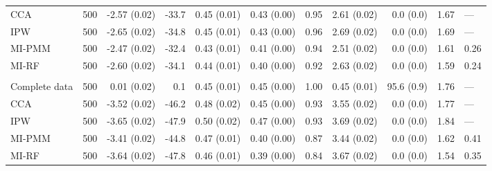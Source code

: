 \documentclass[11pt,a4paper]{article}
\begin{document}
\begin{landscape}
\begin{longtable}{l|rrrrrrrrrl}
CCA & 500 & -2.57 (0.02) & -33.7 & 0.45 (0.01) & 0.43 (0.00) & 0.95 & 2.61 (0.02) & 0.0 (0.0) & 1.67 & — \\ 
IPW & 500 & -2.65 (0.02) & -34.8 & 0.45 (0.01) & 0.43 (0.00) & 0.96 & 2.69 (0.02) & 0.0 (0.0) & 1.69 & — \\ 
MI-PMM & 500 & -2.47 (0.02) & -32.4 & 0.43 (0.01) & 0.41 (0.00) & 0.94 & 2.51 (0.02) & 0.0 (0.0) & 1.61 & 0.26 \\ 
MI-RF & 500 & -2.60 (0.02) & -34.1 & 0.44 (0.01) & 0.40 (0.00) & 0.92 & 2.63 (0.02) & 0.0 (0.0) & 1.59 & 0.24 \\ 
\midrule\addlinespace[2.5pt]
\multicolumn{11}{l}{Wasting — MNAR 50\%} \\[2.5pt] 
\midrule\addlinespace[2.5pt]
Complete data & 500 & 0.01 (0.02) & 0.1 & 0.45 (0.01) & 0.45 (0.00) & 1.00 & 0.45 (0.01) & 95.6 (0.9) & 1.76 & — \\ 
CCA & 500 & -3.52 (0.02) & -46.2 & 0.48 (0.02) & 0.45 (0.00) & 0.93 & 3.55 (0.02) & 0.0 (0.0) & 1.77 & — \\ 
IPW & 500 & -3.65 (0.02) & -47.9 & 0.50 (0.02) & 0.47 (0.00) & 0.93 & 3.69 (0.02) & 0.0 (0.0) & 1.84 & — \\ 
MI-PMM & 500 & -3.41 (0.02) & -44.8 & 0.47 (0.01) & 0.40 (0.00) & 0.87 & 3.44 (0.02) & 0.0 (0.0) & 1.62 & 0.41 \\ 
MI-RF & 500 & -3.64 (0.02) & -47.8 & 0.46 (0.01) & 0.39 (0.00) & 0.84 & 3.67 (0.02) & 0.0 (0.0) & 1.54 & 0.35 \\ 
\bottomrule
\end{longtable}
\endgroup

\end{landscape}
\clearpage
\end{document}
